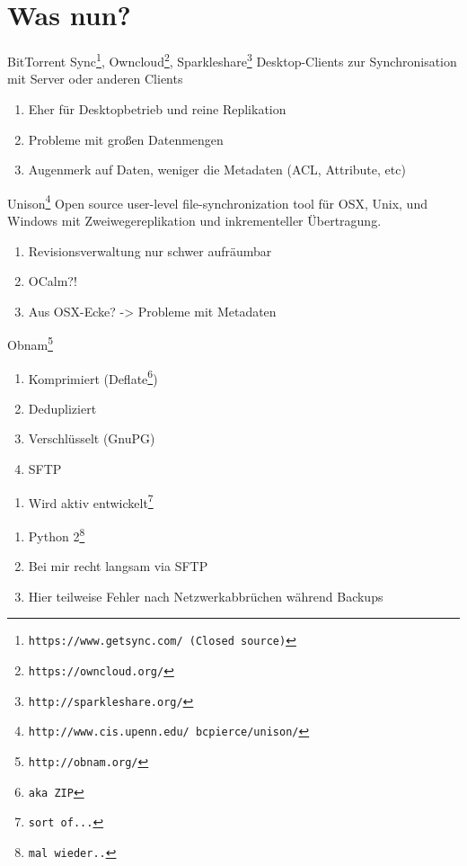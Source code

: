 \documentclass{beamer}
\begin{document}
\section{Was nun?}

\begin{frame}{BitTorrent Sync\footnote{\texttt{https://www.getsync.com/ (Closed source)}}, Owncloud\footnote{\texttt{https://owncloud.org/}}, Sparkleshare\footnote{\texttt{http://sparkleshare.org/}}}\pause
	Desktop-Clients zur Synchronisation mit Server oder anderen Clients\pause
	\begin{enumerate}[-]
    	\item Eher für Desktopbetrieb und reine Replikation\pause
    	\item Probleme mit großen Datenmengen\pause
    	\item Augenmerk auf Daten, weniger die Metadaten (ACL, Attribute, etc)
  	\end{enumerate}
\end{frame}

\begin{frame}{Unison\footnote{\texttt{http://www.cis.upenn.edu/~bcpierce/unison/}}}\pause
Open source user-level file-synchronization tool für OSX, Unix, und Windows mit Zweiwegereplikation und inkrementeller Übertragung.\pause
	\begin{enumerate}[-]
    	\item Revisionsverwaltung nur schwer aufräumbar\pause
    	\item OCalm?!\pause
    	\item Aus OSX-Ecke? -> Probleme mit Metadaten
  	\end{enumerate}
\end{frame}

\begin{frame}{Obnam\footnote{\texttt{http://obnam.org/}}}\pause

	\begin{enumerate}[+]
    	\item Komprimiert (Deflate\footnote{\texttt{aka ZIP}})\pause
    	\item Dedupliziert\pause
    	\item Verschlüsselt (GnuPG)\pause
    	\item SFTP\pause
  	\end{enumerate}
    \begin{enumerate}[o]
    	\item Wird aktiv entwickelt\footnote{\texttt{sort of...}}\pause
  	\end{enumerate}\begin{enumerate}[-]
    	\item Python 2\footnote{\texttt{mal wieder..}}\pause
        \item Bei mir recht langsam via SFTP\pause
        \item Hier teilweise Fehler nach Netzwerkabbrüchen während Backups
  	\end{enumerate}
\end{frame}
\end{document}
